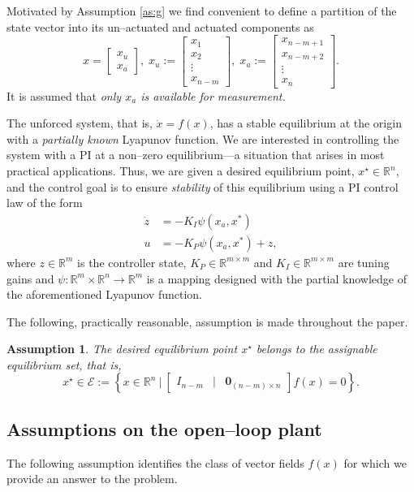 \documentclass[10pt, conference]{ieeeconf}
\newtheorem{assumption}{Assumption}
\def\rea{\mathbb{R}}
\def\begequarrs{\begin{eqnarray*}}
\def\endequarrs{\end{eqnarray*}}
\def\lab{\label}
\def\lef[{\left[\begin{array}}
	\def\rig]{\end{array}\right]}
\begin{document}
Motivated by Assumption \ref{as:g} we find convenient to define a partition of the state vector into its un--actuated and actuated components as
$$
x=\lef[{c} x_u \\ x_a\rig],\;x_u:=\lef[{c} x_1 \\ x_2 \\ \vdots \\ x_{n-m}\rig],\;x_a:=\lef[{c} x_{n-m+1}\\x_{n-m+2}\\ \vdots \\ x_n\rig].
$$
It is assumed that {\em only $x_a$ is available for measurement.}

The unforced system, that is, $\dot x = f(x)$,
has a stable equilibrium at the origin with a {\em partially known} Lyapunov function.  We are interested in controlling the system with a PI at a non--zero equilibrium---a situation that arises in most practical applications.
Thus, we are given a desired equilibrium point, $x^{\star}\in\mathbb{R}^n$, and the control goal is to ensure {\em stability} of this equilibrium using a PI control law of the form
\begequarrs
\dot{z} &= - K_I \psi(x_a,x^*)\\
u &= - K_P  \psi(x_a,x^*) + z,		
\endequarrs
where $z \in \rea^m$ is the controller state, $K_P \in \rea^{m \times m}$ and $K_I \in \rea^{m \times m}$ are tuning gains and $\psi: \mathbb{R}^m \times \mathbb{R}^n \to \mathbb{R}^m$ is a mapping designed with the partial knowledge of the aforementioned Lyapunov function.

The following, practically reasonable, assumption is made throughout the paper.
\begin{assumption} 
\label{as:xstar}
The desired equilibrium point $x^\star$ belongs to the assignable equilibrium set, that is,
\begin{equation}\label{eqset}
	x^\star\in\mathcal{E}:=\left\{x \in \rea^n \ |\  \lef[{ccc} I_{n-m} & | & \mathbf{0}_{(n-m) \times n} \rig] f(x)= 0 \right\}.
\end{equation}
\end{assumption}
\subsection{Assumptions on the open--loop plant}
\lab{subsec22}
The following assumption identifies the class of vector fields $f(x)$ for which we provide an answer to the problem.\\
\end{document}
